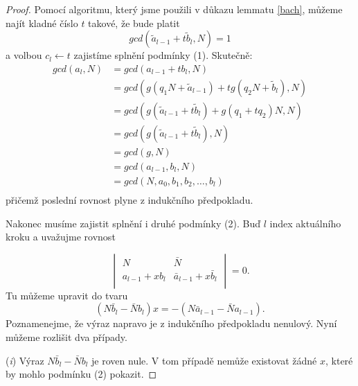 \begin{proof}
Pomocí algoritmu, který jsme použili v důkazu lemmatu \ref{bach}, můžeme najít
kladné číslo $ t $ takové, že bude platit
\begin{equation}\label{t_search}
    gcd(\tilde{a}_{l-1} + t \tilde{b}_{l}, N) = 1
\end{equation}
a volbou $ c_l \leftarrow t $ zajistíme splnění podmínky (1). Skutečně:
\begin{align*}
    gcd(a_l, N) &= gcd(a_{l-1} + t b_l, N)  \\
                &= gcd(g (q_1 N +  \tilde{a}_{l-1})
                        + tg(q_2 N + \tilde{b}_{l}), N) \\
                &= gcd(g (\tilde{a}_{l-1} + t \tilde{b}_{l})
                        + g (q_1 + t q_2) N, N) \\
                &= gcd(g (\tilde{a}_{l-1} + t \tilde{b}_{l}), N) \\
                &= gcd(g, N) \\
                &= gcd(a_{l-1}, b_l, N) \\
                &= gcd(N, a_0, b_1, b_2, \dots, b_l) \\
\end{align*}
přičemž poslední rovnost plyne z indukčního předpokladu.

Nakonec musíme zajistit splnění i druhé podmínky (2). Buď $ l $ index aktuálního
kroku a uvažujme rovnost

\begin{equation}\label{det}
    \begin{vmatrix}
        N & \bar{N} \\
        a_{l-1} + x b_l & \bar{a}_{l-1} + x \bar{b}_l  \\
    \end{vmatrix}
    = 0.
\end{equation}
Tu můžeme upravit do tvaru
\begin{equation}
    (N \bar{b}_l - \bar{N} b_l) x = -(N \bar{a}_{l-1} - \bar{N} a_{l-1}).
\end{equation}
Poznamenejme, že výraz napravo je z indukčního předpokladu nenulový. Nyní můžeme
rozlišit dva případy.

    (\textit{i}) Výraz $ N \bar{b}_l - \bar{N} b_l $ je roven nule. V tom
případě nemůže existovat žádné $ x $, které by mohlo podmínku (2) pokazit.


\end{proof}
